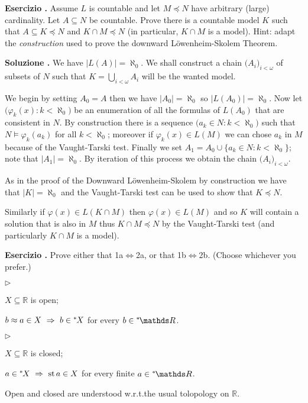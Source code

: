 \documentclass[10pt]{article}
\def\phi{\varphi}
\def\RR{\mathds R}
\def\IMP{\Rightarrow}
\def\IFF{\Leftrightarrow}
\newcommand{\labella}[1]{{\sf\footnotesize #1}\hfill}
\renewenvironment{itemize}
  {\begin{list}{$\triangleright$}{%
   \setlength{\parskip}{0mm}
   \setlength{\topsep}{0mm}
   \setlength{\rightmargin}{0mm}
   \setlength{\listparindent}{0mm}
   \setlength{\itemindent}{0mm}
   \setlength{\labelwidth}{3ex}
   \setlength{\itemsep}{0mm}
   \setlength{\parsep}{0mm}
   \setlength{\partopsep}{0mm}
   \setlength{\labelsep}{1ex}
   \setlength{\leftmargin}{\labelwidth+\labelsep}
   \let\makelabel\labella}}{%
   \end{list}}
\newcounter{ex}
\newenvironment{exercise}{\clearpage\addtocounter{ex}{1}\textbf{Esercizio \theex.\quad}}{}
\newcounter{sol}
\newenvironment{solution}{\addtocounter{sol}{1}\textbf{Soluzione \theex.\quad}}{}
\def\nsR{{}^*\kern-.2ex\RR}
\def\ns{{}^*\kern-.2ex}
\def\st{{\rm st}}
\def\ssf#1{\textsf{#1}}
\begin{document}
\begin{exercise}
  Assume $L$ is countable and let $M\preceq N$ have arbitrary (large) cardinality.
  Let $A\subseteq N$ be countable.
  Prove there is a countable model $K$ such that $A\subseteq K\preceq N$ and $K\cap M\preceq N$ (in particular, $K\cap M$ is a model).
  Hint: adapt the \textit{construction\/} used to prove the downward L\"owenheim-Skolem Theorem.
\end{exercise}

\begin{solution}
  We have \(|L(A)| = \aleph_0\).
  We shall construct a chain \(\big(A_i\big)_{i<\omega}\) of subsets of \(N\) such that \(K = \bigcup_{i<\omega}A_i\) will be the wanted model.

  We begin by setting \(A_0 = A\) then we have \(|A_0| = \aleph_0\) so \(|L(A_0)| = \aleph_0\).
  Now let \(\big(\phi_k(x)\colon k < \aleph_0\big)\) be an enumeration of all the formulas of \(L(A_0)\) that are consistent in \(N\).
  By construction there is a sequence \(\big(a_k\in N\colon k < \aleph_0\big)\) such that \(N\models \phi_k(a_k)\) for all \(k<\aleph_0\);
  moreover if \(\phi_k(x)\in L(M)\) we can chose \(a_k\) in \(M\) because of the Vaught-Tarski test.
  Finally we set \(A_1 = A_0 \cup \big\{a_k\in N\colon k<\aleph_0\big\}\); note that \(|A_1|=\aleph_0\).
  By iteration of this process we obtain the chain \(\big(A_i\big)_{i<\omega}\).

  As in the proof of the Downward L\"owenheim-Skolem by construction we have that \(|K| = \aleph_0\) and the Vaught-Tarski test can be used to show that \(K\preceq N\).

  Similarly if \(\phi(x)\in L(K\cap M)\) then \(\phi(x)\in L(M)\) and so \(K\) will contain a solution that is also in \(M\) thus \(K\cap M\preceq N\) by the Vaught-Tarski test (and particularly \(K\cap M\) is a model).
\end{solution}
  
\begin{exercise}
  Prove either that \ssf{1a}$\IFF$\ssf{2a}, or that \ssf{1b}$\IFF$\ssf{2b}. (Choose whichever you prefer.)

  \begin{minipage}{.5\textwidth}
    \begin{itemize}
    \item[1a.] $X\subseteq\RR$ is open;
    \item[2a.] $b\approx a\in X \ \IMP\ b\in\ns X$ for every $b\in\nsR$.
    \end{itemize}
  \end{minipage}
  \begin{minipage}{.5\textwidth}
    \begin{itemize}
    \item[1b.] $X\subseteq\RR$ is closed;
    \item[2b.] $a\in\ns X \ \IMP\ \st\, a\in X$ for every finite $a\in\nsR$.
    \end{itemize}
  \end{minipage}
  
  Open and closed are understood w.r.t.\@ the usual tolopology on $\RR$.
\end{exercise}
\end{document}
